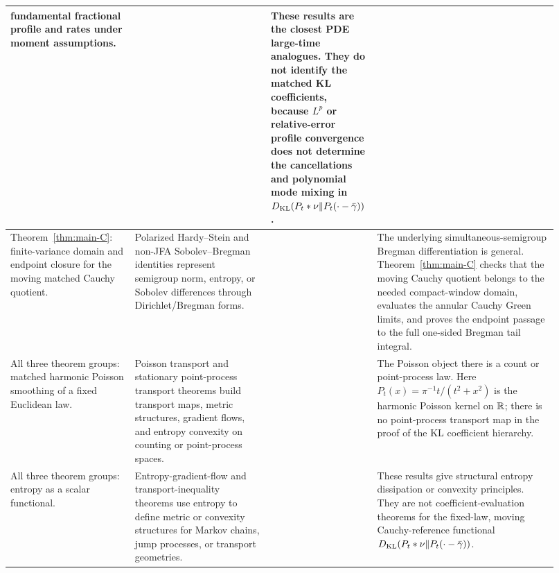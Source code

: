 {\begin{longtable}{>{\raggedright\arraybackslash}p{0.22\linewidth}|%
>{\raggedright\arraybackslash}p{0.24\linewidth}|%
>{\raggedright\arraybackslash}p{0.14\linewidth}|%
>{\raggedright\arraybackslash}p{0.32\linewidth}}
fundamental fractional profile and rates under moment assumptions.
& \cite{Vazquez2018FractionalHeatEuclidean,
FilaIshigeKawakami2012PoissonKernel,
Iwabuchi2015CriticalBurgersPoisson,
Papageorgiou2024FractionalLargeTime}
& These results are the closest PDE large-time analogues.  They do not
identify the matched KL coefficients, because \(L^p\) or relative-error
profile convergence does not determine the cancellations and polynomial mode
mixing in
\(D_{\rm KL}(P_t*\nu\|P_t(\cdot-\bar\gamma))\).\\
\hline
Theorem~\ref{thm:main-C}: finite-variance domain and endpoint closure for the
moving matched Cauchy quotient.
& Polarized Hardy--Stein and non-JFA Sobolev--Bregman identities represent
semigroup norm, entropy, or Sobolev differences through Dirichlet/Bregman
forms.
& \cite{BogdanGutowskiPietruskaPaluba2025PolarizedHardyStein,
GutowskiKwasnicki2025BeurlingDenySobolevBregman}
& The underlying simultaneous-semigroup Bregman differentiation is general.
Theorem~\ref{thm:main-C} checks that the moving Cauchy quotient belongs to the
needed compact-window domain, evaluates the annular Cauchy Green limits, and
proves the endpoint passage to the full one-sided Bregman tail integral.\\
\hline
All three theorem groups: matched harmonic Poisson smoothing of a fixed
Euclidean law.
& Poisson transport and stationary point-process transport theorems build
transport maps, metric structures, gradient flows, and entropy convexity on
counting or point-process spaces.
& \cite{LopezRiveraShenfeld2025PoissonTransport,
ErbarHuesmannJalowyMuller2025StationaryPointTransport}
& The Poisson object there is a count or point-process law.  Here
\(P_t(x)=\pi^{-1}t/(t^2+x^2)\) is the harmonic Poisson kernel on \(\mathbb{R}\);
there is no point-process transport map in the proof of the KL coefficient
hierarchy.\\
\hline
All three theorem groups: entropy as a scalar functional.
& Entropy-gradient-flow and transport-inequality theorems use entropy to
define metric or convexity structures for Markov chains, jump processes, or
transport geometries.
& \cite{OttoVillani2000,Maas2011EntropyMarkov,Erbar2014JumpEntropy}
& These results give structural entropy dissipation or convexity principles.
They are not coefficient-evaluation theorems for the fixed-law, moving
Cauchy-reference functional
\(D_{\rm KL}(P_t*\nu\|P_t(\cdot-\bar\gamma))\).\\
\end{longtable}
}

